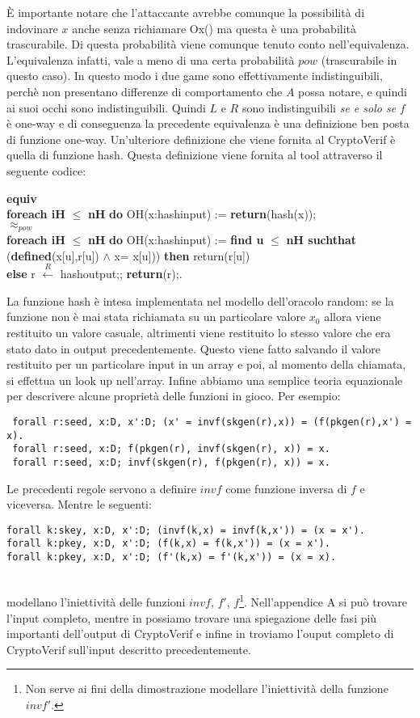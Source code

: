 \documentclass[a4paper,openright,twoside,12pt]{report}
\newcommand{\foreach}[2]{\textbf{foreach #1} $\leq$ \textbf{#2} \textbf{do}}
\newcommand{\return}[1]{\textbf{return}(#1);}
\newcommand{\setR}[2]{#1 $\xleftarrow{R}$ #2;}
\newcommand{\find}[6]{\textbf{find #1} $\leq$ \textbf{#2 suchthat} (\textbf{defined}(#3) $\wedge$ #4)) \textbf{then} #5 \\ \textbf{else} #6}
\newcommand{\equiva}{\textbf{equiv}}
\begin{document}
\`E importante notare che l'attaccante avrebbe comunque la possibilit\`a di indovinare $x$ anche senza richiamare Ox() ma questa \`e una probabilit\`a trascurabile. 
Di questa probabilit\`a viene comunque tenuto conto nell'equivalenza. L'equivalenza infatti, vale a meno di una certa probabilit\`a $pow$ (trascurabile in questo caso).
In questo modo i due game sono effettivamente indistinguibili, perch\`e non presentano differenze di comportamento che $A$ possa notare, e quindi ai suoi occhi sono indistinguibili.
Quindi $L$ e $R$ sono indistinguibili \emph{se e solo se} $f$ \`e one-way e di conseguenza la precedente equivalenza \`e una definizione ben posta di funzione one-way.
Un'ulteriore definizione che viene fornita al CryptoVerif \`e quella di funzione hash. Questa definizione viene fornita al tool attraverso il seguente codice:

 \equiva \\ 
  \foreach{iH}{nH} OH(x:hashinput) := \return{hash(x)}\\
    \textbf{$\approx _{pow}$}\\  
     \foreach{iH}{nH} OH(x:hashinput) :=
   \find{u}{nH}{x[u],r[u]}{x= x[u]}{return(r[u])}{\setR{r}{hashoutput}; \return{r}.}
 
La funzione hash \`e intesa implementata nel modello dell'oracolo random: se la funzione non \`e mai stata richiamata su un particolare valore $x_0$ allora viene restituito un valore casuale, 
altrimenti viene restituito lo stesso valore che era stato dato in output precedentemente. Questo viene fatto salvando il valore restituito per un particolare input in un array e poi,
al momento della chiamata, si effettua un look up nell'array.
Infine abbiamo una semplice teoria equazionale per descrivere alcune propriet\`a delle funzioni in gioco.
Per esempio:
\begin{verbatim}
 forall r:seed, x:D, x':D; (x' = invf(skgen(r),x)) = (f(pkgen(r),x') = x).
 forall r:seed, x:D; f(pkgen(r), invf(skgen(r), x)) = x.
 forall r:seed, x:D; invf(skgen(r), f(pkgen(r), x)) = x.
\end{verbatim}
Le precedenti regole servono a definire $invf$ come funzione inversa di $f$ e viceversa. Mentre le seguenti:
\begin{verbatim}
forall k:skey, x:D, x':D; (invf(k,x) = invf(k,x')) = (x = x').
forall k:pkey, x:D, x':D; (f(k,x) = f(k,x')) = (x = x').
forall k:pkey, x:D, x':D; (f'(k,x) = f'(k,x')) = (x = x).
\end{verbatim}\\
modellano l'iniettivit\`a delle funzioni $invf$, $f'$, $f$\footnote{Non serve ai fini della dimostrazione modellare l'iniettivit\`a della funzione $invf'$.}.
Nell'appendice A si pu\`o trovare l'input completo, mentre in \cite{BlanchetPointchevalCrypto06} possiamo trovare una spiegazione delle fasi 
pi\`u importanti dell'output di CryptoVerif e infine in \cite{fdhall} troviamo l'ouput completo di CryptoVerif sull'input descritto precedentemente.
\end{document}
